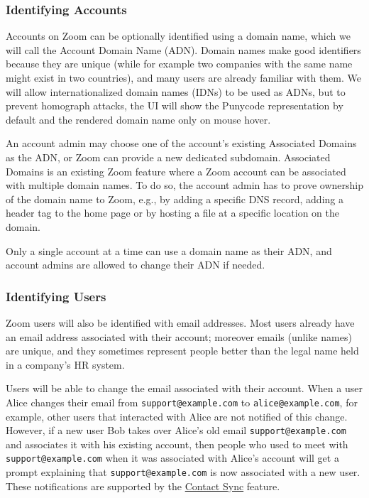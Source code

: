 \subsubsection{Identifying Accounts}

Accounts on Zoom can be optionally identified using a domain name, which we will call the Account
Domain Name (ADN). Domain names make good identifiers because they are unique (while for example two
companies with the same name might exist in two countries), and many users are already familiar with
them. We will allow internationalized domain names (IDNs) to be used as ADNs, but to prevent
homograph attacks, the UI will show the Punycode representation by default and the rendered domain
name only on mouse hover.

An account admin may choose one of the account’s existing Associated Domains as the ADN, or Zoom can
provide a new dedicated subdomain. Associated Domains is an existing Zoom feature where a Zoom
account can be associated with multiple domain names. To do so, the account admin has to prove
ownership of the domain name to Zoom, e.g., by adding a specific DNS record, adding a header tag to
the home page or by hosting a file at a specific location on the domain.

Only a single account at a time can use a domain name as their ADN, and account admins are allowed
to change their ADN if needed.

\subsubsection{Identifying Users}

Zoom users will also be identified with email addresses. Most users already have an email address
associated with their account; moreover emails (unlike names) are unique, and they sometimes
represent people better than the legal name held in a company’s HR system.

Users will be able to change the email associated with their account. When a user Alice changes
their email from \texttt{support@example.com} to \texttt{alice@example.com}, for example, other
users that interacted with Alice are not notified of this change. However, if a new user Bob takes
over Alice’s old email \texttt{support@example.com} and associates it with his existing account,
then people who used to meet with \texttt{support@example.com} when it was associated with Alice’s
account will get a prompt explaining that \texttt{support@example.com} is now associated with a new
user. These notifications are supported by the \hyperref[subsec:contactsync]{Contact Sync} feature.

